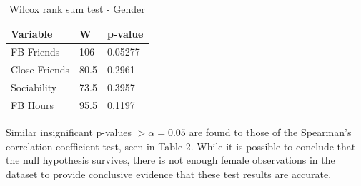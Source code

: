 \begin{table}[H]
\centering
\caption{Wilcox rank sum test - Gender}
\begin{tabular}{l|l|l}
Variable      & W    & p-value \\ \hline
FB Friends    & 106  & 0.05277 \\ \hline
Close Friends & 80.5 & 0.2961  \\ \hline
Sociability   & 73.5 & 0.3957  \\ \hline
FB Hours      & 95.5 & 0.1197  \\ \hline
\end{tabular}
\end{table}

Similar insignificant p-values $> \alpha = 0.05$ are found to those of the Spearman's correlation coefficient test, seen in Table 2. While it is possible to conclude that the null hypothesis survives, there is not enough female observations in the dataset to provide conclusive evidence that these test results are accurate.